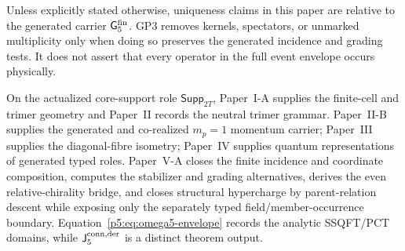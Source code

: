 \documentclass[12pt,a4paper]{article}
\begin{document}
\begin{remark}
\label{p5:rem:finite-carrier-uniqueness}
Unless explicitly stated otherwise, uniqueness claims in this paper are
relative to the generated carrier \(\mathsf G_5^{\rm fin}\).
GP3 removes kernels, spectators, or unmarked multiplicity only when doing so
preserves the generated incidence and grading tests.  It does not assert that
every operator in the full event envelope occurs physically.
\end{remark}

\begin{remark}
\label{p5:rem:upstream-finite-import-order}
On the actualized core-support role \(\mathsf{Supp}_{2T}\), Paper~I-A supplies
the finite-cell and trimer geometry and Paper~II records the neutral trimer
grammar.  Paper~II-B supplies the generated and co-realized \(m_p=1\)
momentum carrier; Paper~III supplies the diagonal-fibre isometry; Paper~IV
supplies quantum representations of generated typed roles.  Paper~V-A closes
the finite incidence and coordinate composition, computes the stabilizer and
grading alternatives, derives the even relative-chirality bridge, and closes structural hypercharge by parent-relation descent while exposing
only the separately typed field/member-occurrence boundary.
Equation~\eqref{p5:eq:omega5-envelope} records the analytic SSQFT/PCT
domains, while
\(\mathsf J_5^{\rm conn,der}\) is a distinct theorem output.
\end{remark}
\end{document}
